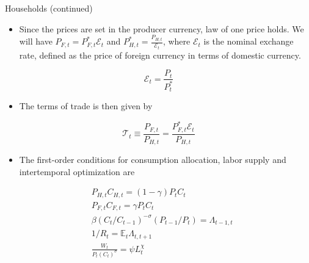 \documentclass[10pt]{beamer}
\begin{document}
\begin{frame}{Households (continued)}
\fontsize{8}{8}\selectfont

\begin{itemize}
    \item Since the prices are set in the producer currency, law of one price holds. We will have $P_{F, t}=P_{F, t}^{*} \mathcal{E}_{t}$ and $P_{H, t}^{*}=\frac{P_{H, t}}{\mathcal{E}_{t}}$, where $\mathcal{E}_{t}$ is the nominal exchange rate, defined as the price of foreign currency in terms of domestic currency. 
\end{itemize}


$$
\mathcal{E}_{t}=\frac{P_{t}}{P_{t}^{*}}
$$



\begin{itemize}
    \item The terms of trade is then given by
\end{itemize}


$$
\mathcal{T}_{t} \equiv \frac{P_{F, t}}{P_{H, t}}=\frac{P_{F, t}^{*} \mathcal{E}_{t}}{P_{H, t}}
$$

\begin{itemize}
    \item The first-order conditions for consumption allocation, labor supply and intertemporal optimization are
\end{itemize}



$$
\begin{aligned}
& P_{H, t} C_{H, t}=(1-\gamma) P_{t} C_{t} \\
& P_{F, t} C_{F, t}=\gamma P_{t} C_{t} \\
& \beta\left(C_{t} / C_{t-1}\right)^{-\sigma}\left(P_{t-1} / P_{t}\right)=\Lambda_{t-1, t} \\
& 1 / R_{t}=\mathbb{E}_{t} \Lambda_{t, t+1} \\
& \frac{W_{t}}{P_{t}\left(C_{t}\right)^{\sigma}}=\psi L_{t}^{\chi}
\end{aligned}
$$
\end{frame}
\end{document}
